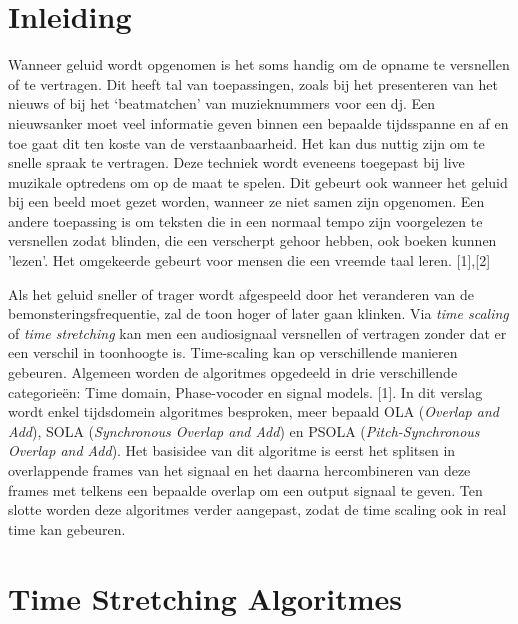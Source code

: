 \documentclass[12pt]{report}
\begin{document}
\tableofcontents

\chapter{Inleiding}
\label{references} 
Wanneer geluid wordt opgenomen is het soms handig om de opname te versnellen of te vertragen. Dit heeft tal van toepassingen, zoals bij het presenteren van het nieuws of bij het ‘beatmatchen’ van muzieknummers voor een dj. Een nieuwsanker moet veel informatie geven binnen een bepaalde tijdsspanne en af en toe gaat dit ten koste van de verstaanbaarheid. Het kan dus nuttig zijn om te snelle spraak te vertragen. Deze techniek wordt eveneens toegepast bij live muzikale optredens om op de maat te spelen.
Dit gebeurt ook wanneer het geluid bij een beeld moet gezet worden, wanneer ze niet samen zijn opgenomen. Een andere toepassing is om teksten die in een normaal tempo zijn voorgelezen te versnellen zodat blinden, die een verscherpt gehoor hebben, ook boeken kunnen 'lezen'. Het omgekeerde gebeurt voor mensen die een vreemde taal leren. [1],[2]
\cite{Thesis}

Als het geluid sneller of trager wordt afgespeeld door het veranderen van de bemonsteringsfrequentie, zal de toon hoger of later gaan klinken. Via \textit{time scaling} of \textit{time stretching} kan men een audiosignaal versnellen of vertragen zonder dat er een verschil in toonhoogte is. Time-scaling kan op verschillende manieren gebeuren. Algemeen worden de algoritmes opgedeeld in drie verschillende categorie\"{e}n: Time domain, Phase-vocoder en signal models. [1]. In dit verslag wordt enkel tijdsdomein algoritmes besproken, meer bepaald OLA (\textit{Overlap and Add}), SOLA (\textit{Synchronous Overlap and Add}) en PSOLA (\textit{Pitch-Synchronous Overlap and Add}). Het basisidee  van dit algoritme is eerst het splitsen in overlappende frames van het signaal en het daarna hercombineren van deze frames met telkens een bepaalde overlap om een output signaal te geven. Ten slotte worden deze algoritmes verder aangepast, zodat de time scaling ook in real time kan gebeuren.

\chapter{Time Stretching Algoritmes}
\end{document}

